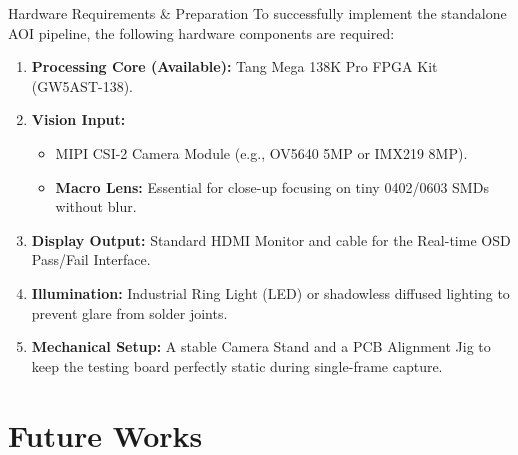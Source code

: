 \documentclass[t, aspectratio=169]{beamer}
\begin{document}
    \begin{frame}{Hardware Requirements \& Preparation}
		To successfully implement the standalone AOI pipeline, the following hardware components are required:
		
		\vspace{1em}
		\begin{enumerate}
			\item \textbf{Processing Core (Available):} Tang Mega 138K Pro FPGA Kit (GW5AST-138).
			\item \textbf{Vision Input:} 
            \begin{itemize}
                \item MIPI CSI-2 Camera Module (e.g., OV5640 5MP or IMX219 8MP).
                \item \textbf{Macro Lens:} Essential for close-up focusing on tiny 0402/0603 SMDs without blur.
            \end{itemize}
            \vspace{0.3em}
			\item \textbf{Display Output:} Standard HDMI Monitor and cable for the Real-time OSD Pass/Fail Interface.
            \vspace{0.3em}
            \item \textbf{Illumination:} Industrial Ring Light (LED) or shadowless diffused lighting to prevent glare from solder joints.
            \vspace{0.3em}
            \item \textbf{Mechanical Setup:} A stable Camera Stand and a PCB Alignment Jig to keep the testing board perfectly static during single-frame capture.
		\end{enumerate}
	\end{frame}

	\section{Future Works}
	\useStyleLogoOnly 
	\useThickBar 
\end{document}
